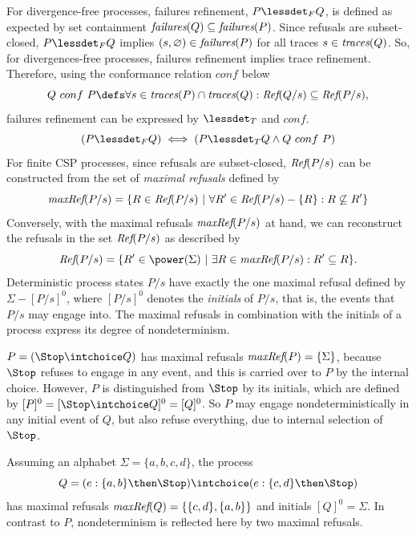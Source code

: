 For divergence-free processes, failures refinement, $P \lessdet_F Q$, is
defined as expected by set containment $\text{\it failures}(Q)\subseteq\text{\it failures}(P)$. Since
refusals are subset-closed, $P \lessdet_F Q$ implies
$(s,\varnothing)\in\text{\it failures}(P)$ for all traces $s\in\text{\it traces}(Q)$. So, for
divergences-free processes, failures refinement implies trace refinement.
Therefore, using the conformance relation $conf$ below
%
\begin{equation}\label{eq:conf}
  Q\ conf\ P \defs \forall s\in \trc(P) \cap \trc(Q): \refs(Q/s)
  \subseteq \refs(P/s),
\end{equation}
%
failures refinement can be expressed by $\lessdet_T$ and $conf$.
%
\begin{equation}\label{thm:fref-tref-conf}
(P \lessdet_F Q) \iff (P \lessdet_T Q \land Q\ conf\ P)
\end{equation}
%
For finite CSP processes, since refusals are
subset-closed, $\text{\it Ref}(P/s)$ can be constructed from the set of \emph{maximal
refusals} defined by
%
\begin{equation}
\text{\it maxRef}(P/s) = \{ R \in\text{\it Ref}(P/s)~|~\forall R'\in \text{\it Ref}(P/s) - \{ R\}: R \not\subseteq R'\}
\end{equation}
%
Conversely, with the maximal refusals $\text{\it maxRef}(P/s)$ at hand, we can
reconstruct the refusals in the set $\text{\it Ref}(P/s)$ as described by
%
\begin{equation}\label{eq:refMaxRef}
\refs(P/s) = \{ R'\in\power(\Sigma)~|~\exists R\in \maxrefs(P/s): R'\subseteq R \}.
\end{equation}
%
Deterministic process states $P/s$ have exactly the one maximal refusal
defined by $\Sigma-[P/s]^0$, where $[P/s]^0$ denotes the \emph{initials} of
$P/s$, that is, the events that $P/s$ may engage into. The maximal refusals
in combination with the initials of a process express its degree of
nondeterminism.
%
\begin{example}
\label{ex:nondetdegree} $P = (\Stop \intchoice Q)$ has maximal refusals
$\text{\it maxRef}(P) = \{ \Sigma \}$, because $\Stop$ refuses to engage in any event,
and this is carried over to $P$ by the internal choice. However, $P$ is
distinguished from $\Stop$ by its initials, which are defined by $[P]^0 = [
\Stop \intchoice Q]^0 = [Q]^0$. So $P$ may engage nondeterministically in any
initial event of $Q$, but also refuse everything, due to internal selection
of $\Stop$.

Assuming an alphabet $\Sigma = \{a,b,c,d\}$, the process
%
$$Q = (e:\{a,b\} \then \Stop) \intchoice (e:\{c,d\} \then \Stop)$$
%
has maximal refusals $\text{\it maxRef}(Q) = \{ \{c,d\}, \{a,b\} \}$ and initials
$[Q]^0=\Sigma$. In contrast to $P$, nondeterminism is reflected here by
two maximal refusals. \xbox
\end{example}



